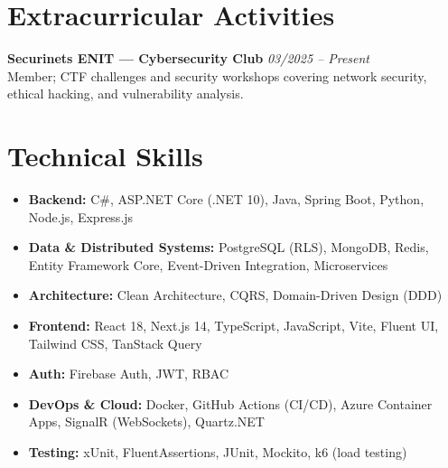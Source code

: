 \documentclass[11pt,a4paper]{article}
\begin{document}
\section{Extracurricular Activities}
\textbf{Securinets ENIT --- Cybersecurity Club} \hfill \textit{03/2025 -- Present} \\
Member; CTF challenges and security workshops covering network security, ethical hacking, and vulnerability analysis.

\section{Technical Skills}
\begin{itemize}[leftmargin=*, itemsep=0pt, parsep=0pt, topsep=0pt]
    \item \textbf{Backend:} C\#, ASP.NET Core (.NET 10), Java, Spring Boot, Python, Node.js, Express.js
    \item \textbf{Data \& Distributed Systems:} PostgreSQL (RLS), MongoDB, Redis, Entity Framework Core, Event-Driven Integration, Microservices
    \item \textbf{Architecture:} Clean Architecture, CQRS, Domain-Driven Design (DDD)
    \item \textbf{Frontend:} React 18, Next.js 14, TypeScript, JavaScript, Vite, Fluent UI, Tailwind CSS, TanStack Query
    \item \textbf{Auth:} Firebase Auth, JWT, RBAC
    \item \textbf{DevOps \& Cloud:} Docker, GitHub Actions (CI/CD), Azure Container Apps, SignalR (WebSockets), Quartz.NET
    \item \textbf{Testing:} xUnit, FluentAssertions, JUnit, Mockito, k6 (load testing)
\end{itemize}
\end{document}

